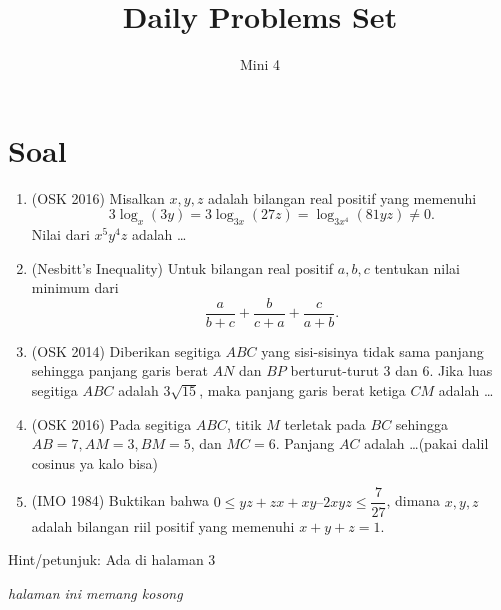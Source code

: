 \documentclass[12pt]{scrartcl}
\begin{document}
	\title{Daily Problems Set} %
	\date{}
	\author{Mini 4}
	\maketitle

\renewcommand*\contentsname{Daftar Isi}
\tableofcontents

\newpage

	\section{Soal}
	\begin{enumerate}
            \item (OSK 2016) Misalkan $x,y,z$ adalah bilangan real positif yang memenuhi $$3 \log_x (3y) = 3 \log_{3x} (27z) = \log_{3x^4} (81yz) \neq 0.$$ Nilai dari $x^5y^4z$ adalah \dots
    
            \item (Nesbitt's Inequality) Untuk bilangan real positif $a,b,c$ tentukan nilai minimum dari $$\dfrac{a}{b+c}+\dfrac{b}{c+a}+\dfrac{c}{a+b}.$$

            \item (OSK 2014) Diberikan segitiga $ABC$ yang sisi-sisinya tidak sama panjang sehingga panjang garis berat $AN$ dan $BP$ berturut-turut 3 dan 6. Jika luas segitiga $ABC$ adalah $3\sqrt{15}$, maka panjang garis berat ketiga $CM$ adalah \dots
        
            \item (OSK 2016) Pada segitiga $ABC$, titik $M$ terletak pada $BC$ sehingga $AB=7, AM=3, BM=5$, dan $MC=6$. Panjang $AC$ adalah \dots (pakai dalil cosinus ya kalo bisa)
            
            \item (IMO 1984) Buktikan bahwa $0 \leq yz + zx + xy – 2xyz \leq \dfrac{7}{27}$, dimana $x,y,z$ adalah bilangan riil positif yang memenuhi $x + y + z = 1$.
	\end{enumerate}

        Hint/petunjuk: Ada di halaman 3

        \newpage

        \textit{halaman ini memang kosong}

        \newpage
\end{document}
